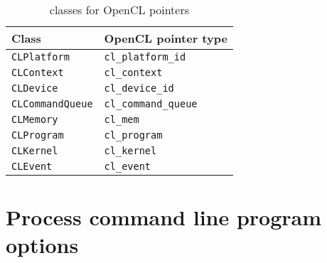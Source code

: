 \begin{table}
  \begin{tabularx}{\textwidth}{XX}
    \toprule
    Class & OpenCL pointer type \\
    \midrule
    \verb|CLPlatform|     & \verb|cl_platform_id|   \\
    \verb|CLContext|      & \verb|cl_context|       \\
    \verb|CLDevice|       & \verb|cl_device_id|     \\
    \verb|CLCommandQueue| & \verb|cl_command_queue| \\
    \verb|CLMemory|       & \verb|cl_mem|           \\
    \verb|CLProgram|      & \verb|cl_program|       \\
    \verb|CLKernel|       & \verb|cl_kernel|        \\
    \verb|CLEvent|        & \verb|cl_event|         \\
    \bottomrule
  \end{tabularx}
  \caption{\protect\raii classes for OpenCL pointers}
  \label{tab:RAII classes for OpenCL pointers}
\end{table}

\section{Process command line program options}
\label{sec:Process command line program options}

